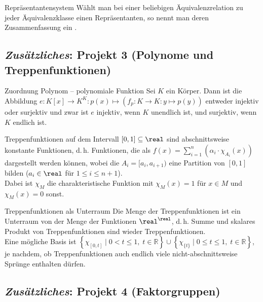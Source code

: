 \begin{Def}{Repräsentantensystem}
    Wählt man bei einer beliebigen Äquivalenzrelation zu jeder
    Äquivalenzklasse einen Repräsentanten, so nennt man deren
    Zusammenfassung ein .
\end{Def}

\subsection{%
    \emph{Zusätzliches}: Projekt 3 (Polynome und Treppenfunktionen)%
}

\begin{Satz}{Zuordnung Polynom -- polynomiale Funktion}
    Sei $K$ ein Körper.
    Dann ist die Abbildung
    $e: K[x] \rightarrow K^K: p(x) \mapsto
    (f_p: K \rightarrow K: y \mapsto p(y))$
    entweder injektiv oder surjektiv und zwar ist
    $e$ injektiv, wenn $K$ unendlich ist, und surjektiv, wenn $K$ endlich ist.
\end{Satz}

\begin{Def}{Treppenfunktionen}
     auf dem Intervall $[0, 1] \subseteq \real$
    sind abschnittsweise konstante Funktionen, d.\,h. Funktionen, die als 
    $f(x) = \sum_{i=1}^n \left(\alpha_i \cdot \chi_{A_i}(x)\right)$ dargestellt
    werden können, wobei die $A_i = [a_i, a_{i+1})$ eine Partition von
    $[0, 1]$ bilden ($a_i \in \real$ für $1 \le i \le n + 1$). \\
    Dabei ist $\chi_M$ die charakteristische Funktion mit $\chi_M(x) = 1$ für
    $x \in M$ und $\chi_M(x) = 0$ sonst.
\end{Def}

\begin{Satz}{Treppenfunktionen als Unterraum}
    Die Menge der Treppenfunktionen ist ein Unterraum von der Menge der
    Funktionen $\real^\real$, d.\,h. Summe und skalares Produkt von
    Treppenfunktionen sind wieder Treppenfunktionen. \\
    Eine mögliche Basis ist
    $\left\{ \chi_{[0, t]} \;|\; 0 < t \le 1,\; t \in \mathbb{R} \right\} \cup
    \left\{ \chi_{\{t\}} \;|\; 0 \le t \le 1,\; t \in \mathbb{R} \right\}$,
    je nachdem, ob Treppenfunktionen auch endlich viele nicht-abschnittsweise
    Sprünge enthalten dürfen.
\end{Satz}

\subsection{%
    \emph{Zusätzliches}: Projekt 4 (Faktorgruppen)%
}

